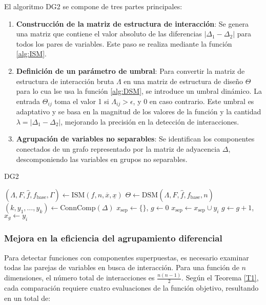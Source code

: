 El algoritmo DG2 se compone de tres partes principales:

\begin{enumerate}
\item \textbf{Construcción de la matriz de estructura de interacción}: Se genera una matriz que contiene el valor absoluto de las diferencias \( |\Delta_1 - \Delta_2| \) para todos los pares de variables. Este paso se realiza mediante la función \ref{alg:ISM}.

\item \textbf{Definición de un parámetro de umbral}: Para convertir la matriz de estructura de interacción bruta $\Lambda$ en una matriz de estructura de diseño $\Theta$ para lo cua lse usa la función \ref{alg:DSM}, se introduce un umbral dinámico. La entrada \(\Theta_{ij}\) toma el valor 1 si \(\Lambda_{ij} > \epsilon\), y 0 en caso contrario. Este umbral es adaptativo y se basa en la magnitud de los valores de la función y la cantidad \(\lambda = |\Delta_1 - \Delta_2|\), mejorando la precisión en la detección de interacciones.

\item \textbf{Agrupación de variables no separables}: Se identifican los componentes conectados de un grafo representado por la matriz de adyacencia \( \Delta \), descomponiendo las variables en grupos no separables.
\end{enumerate}

\begin{algorithm}
\caption{DG2}
\label{alg:DG2}
\begin{algorithmic}[1]
\STATE $(\Lambda, F, \hat{f}, f_{\text{base}}, \Gamma) \gets \text{ISM}(f, n, \overline{x}, \underline{x})$
\STATE $\Theta \gets \text{DSM}(\Lambda, F, \hat{f}, f_{\text{base}}, n)$
\STATE $(k, y_1, \dots, y_k) \gets \text{ConnComp}(\Delta)$
\STATE $x_{\text{sep}} \gets \{\}$, $g \gets 0$
        \STATE $x_{\text{sep}} \gets x_{\text{sep}} \cup y_i$
    \ELSE
        \STATE $g \gets g + 1$, $x_g \gets y_i$
    \ENDIF
\ENDFOR
\end{algorithmic}
\end{algorithm}

\subsubsection{Mejora en la eficiencia del agrupamiento diferencial}

Para detectar funciones con componentes superpuestas, es necesario examinar todas las parejas de variables en busca de interacción. Para una función de \(n\) dimensiones, el número total de interacciones es \(\frac{n(n-1)}{2}\). Según el Teorema \ref{T1}, cada comparación requiere cuatro evaluaciones de la función objetivo, resultando en un total de:

